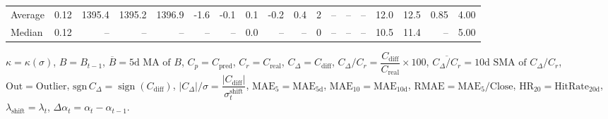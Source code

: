 \begin{threeparttable}
{\begin{tabular}{lrrrrrrrrrrrrrrrrr}
Average &     0.12 & 1395.4 & 1395.2 & 1396.9 &       -1.6 &           -0.1 &                       0.1 &                     -0.2 &                 0.4 &              2 &         -- &        -- &             -- &             12.0 &                12.5 &            0.85 &                   4.00 \\
 Median &     0.12 &     -- &     -- &     -- &         -- &             -- &                       0.0 &                       -- &                  -- &              0 &         -- &        -- &             -- &             10.5 &                11.4 &              -- &                   5.00 \\
\bottomrule
\end{tabular}
}
\begin{tablenotes}\footnotesize
\item $\kappa=\kappa(\sigma)$, $B=B_{t-1}$, $\overline{B}=\text{5d MA of }B$, $C_p=C_{\text{pred}}$, $C_r=C_{\text{real}}$, $C_\Delta=C_{\text{diff}}$, $C_\Delta/C_r=\dfrac{C_{\text{diff}}}{C_{\text{real}}}\times100$, $\overline{C_\Delta/C_r}=\text{10d SMA of }C_\Delta/C_r$, $\mathrm{Out}=\text{Outlier}$, $\mathrm{sgn}\,C_\Delta=\operatorname{sign}(C_{\text{diff}})$, $|C_\Delta|/\sigma=\dfrac{|C_{\text{diff}}|}{\sigma_t^{\text{shift}}}$, $\mathrm{MAE}_5=\mathrm{MAE}_{5\text{d}}$, $\mathrm{MAE}_{10}=\mathrm{MAE}_{10\text{d}}$, $\mathrm{RMAE}= \mathrm{MAE}_5 / \text{Close}$, $\mathrm{HR}_{20}=\mathrm{HitRate}_{20\text{d}}$, $\lambda_{\text{shift}}=\lambda_t$, $\Delta\alpha_t=\alpha_t-\alpha_{t-1}$.
\end{tablenotes}
\end{threeparttable}
\endgroup

